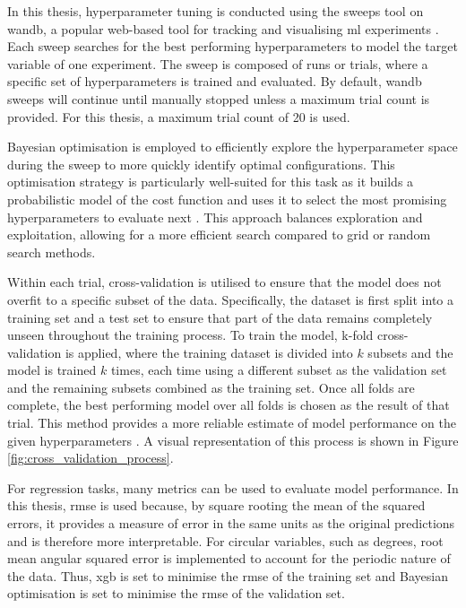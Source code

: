 In this thesis, hyperparameter tuning is conducted using the sweeps tool on \acrfull{wandb}, a popular web-based tool for tracking and visualising \acrshort{ml} experiments \citep{Biewald2020}. Each sweep searches for the best performing hyperparameters to model the target variable of one experiment. The sweep is composed of runs or trials, where a specific set of hyperparameters is trained and evaluated. By default, \acrshort{wandb} sweeps will continue until manually stopped unless a maximum trial count is provided. For this thesis, a maximum trial count of 20 is used.

Bayesian optimisation is employed to efficiently explore the hyperparameter space during the sweep to more quickly identify optimal configurations. This optimisation strategy is particularly well-suited for this task as it builds a probabilistic model of the cost function and uses it to select the most promising hyperparameters to evaluate next \citep{Mockus1994,Shahriari2016}. This approach balances exploration and exploitation, allowing for a more efficient search compared to grid or random search methods.

Within each trial, cross-validation is utilised to ensure that the model does not overfit to a specific subset of the data. Specifically, the dataset is first split into a training set and a test set to ensure that part of the data remains completely unseen throughout the training process. To train the model, k-fold cross-validation is applied, where the training dataset is divided into $k$ subsets and the model is trained $k$ times, each time using a different subset as the validation set and the remaining subsets combined as the training set. Once all folds are complete, the best performing model over all folds is chosen as the result of that trial. This method provides a more reliable estimate of model performance on the given hyperparameters \citep{Lopez2023,Singh2021}. A visual representation of this process is shown in Figure \ref{fig:cross_validation_process}.

For regression tasks, many metrics can be used to evaluate model performance. In this thesis, \acrfull{rmse} is used because, by square rooting the mean of the squared errors, it provides a measure of error in the same units as the original predictions and is therefore more interpretable. For circular variables, such as degrees, root mean angular squared error is implemented to account for the periodic nature of the data. Thus, \acrshort{xgb} is set to minimise the \acrshort{rmse} of the training set and Bayesian optimisation is set to minimise the \acrshort{rmse} of the validation set.


